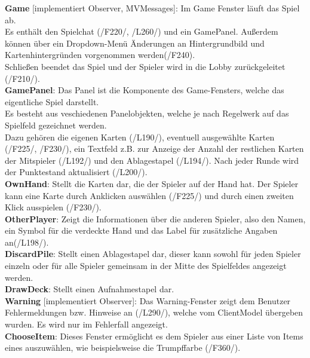 \documentclass{article}
\begin{document}
\textbf{Game} [implementiert Observer, MVMessages]: Im Game Fenster läuft das Spiel ab.\\
Es enthält den Spielchat (/F220/, /L260/) und ein GamePanel. Außerdem können über ein Dropdown-Menü Änderungen an Hintergrundbild und Kartenhintergründen vorgenommen werden(/F240).\\
Schließen beendet das Spiel und der Spieler wird in die Lobby zurückgeleitet (/F210/).\\

\textbf{GamePanel}: Das Panel ist die Komponente des Game-Fensters, welche das eigentliche Spiel darstellt.\\
Es besteht aus veschiedenen Panelobjekten, welche je nach Regelwerk auf das Spielfeld gezeichnet werden. \\
Dazu gehören die eigenen Karten (/L190/), eventuell ausgewählte Karten (/F225/, /F230/), ein Textfeld z.B. zur Anzeige der Anzahl der restlichen Karten der Mitspieler (/L192/) und den Ablagestapel (/L194/). Nach jeder Runde wird der Punktestand  aktualisiert (/L200/). \\

\textbf{OwnHand}: Stellt die Karten dar, die der Spieler auf der Hand hat. Der Spieler kann eine Karte durch Anklicken auswählen (/F225/) und durch einen zweiten Klick ausspielen (/F230/).\\

\textbf{OtherPlayer}: Zeigt die Informationen über die anderen Spieler, also den Namen, ein Symbol für die verdeckte Hand und das Label für zusätzliche Angaben an(/L198/). \\

\textbf{DiscardPile}: Stellt einen Ablagestapel dar, dieser kann sowohl für jeden Spieler einzeln oder für alle Spieler gemeinsam in der Mitte des Spielfeldes angezeigt werden.\\

\textbf{DrawDeck}: Stellt einen Aufnahmestapel dar. \\

\textbf{Warning} [implementiert Observer]: Das Warning-Fenster zeigt dem Benutzer Fehlermeldungen bzw. Hinweise an (/L290/), welche vom ClientModel übergeben wurden. Es wird nur im Fehlerfall angezeigt. \\

\textbf{ChooseItem}: Dieses Fenster ermöglicht es dem Spieler aus einer Liste von Items eines auszuwählen, wie beispielsweise die Trumpffarbe (/F360/). \\
\end{document}
